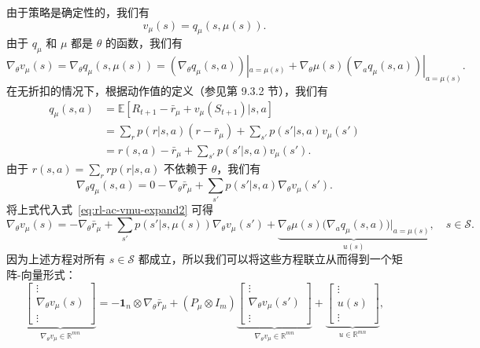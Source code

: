 \begin{derivation}\label{box:rl-ac-dpg-undisc-proof}
由于策略是确定性的，我们有
\[
v_{\mu}(s) = q_{\mu}(s, \mu(s)).
\]
由于 $q_{\mu}$ 和 $\mu$ 都是 $\theta$ 的函数，我们有
\begin{equation}
\nabla_{\theta} v_{\mu}(s) = \nabla_{\theta} q_{\mu}(s, \mu(s)) = (\nabla_{\theta} q_{\mu}(s, a)) |_{a = \mu(s)} + \nabla_{\theta} \mu(s) (\nabla_{a} q_{\mu}(s, a)) |_{a = \mu(s)}.
\label{eq:rl-ac-vmu-expand2}
\end{equation}
在无折扣的情况下，根据动作值的定义（参见第 9.3.2 节），我们有
\[
\begin{aligned}
q_{\mu}(s, a) &= \mathbb{E}[R_{t+1} - \bar{r}_{\mu} + v_{\mu}(S_{t+1}) | s, a] \\
&= \sum_{r} p(r | s, a)(r - \bar{r}_{\mu}) + \sum_{s'} p(s' | s, a) v_{\mu}(s') \\
&= r(s, a) - \bar{r}_{\mu} + \sum_{s'} p(s' | s, a) v_{\mu}(s').
\end{aligned}
\]
由于 $r(s, a) = \sum_{r} r p(r | s, a)$ 不依赖于 $\theta$，我们有
\[
\nabla_{\theta} q_{\mu}(s, a) = 0 - \nabla_{\theta} \bar{r}_{\mu} + \sum_{s'} p(s' | s, a) \nabla_{\theta} v_{\mu}(s').
\]
将上式代入式~\eqref{eq:rl-ac-vmu-expand2} 可得
\[
\nabla_{\theta} v_{\mu}(s) = - \nabla_{\theta} \bar{r}_{\mu} + \sum_{s'} p(s' | s, \mu(s)) \nabla_{\theta} v_{\mu}(s') + \underbrace{\nabla_{\theta} \mu(s) \big( \nabla_{a} q_{\mu}(s, a) \big) |_{a = \mu(s)}}_{u(s)}, \quad s \in \mathcal{S}.
\]
因为上述方程对所有 $s \in \mathcal{S}$ 都成立，所以我们可以将这些方程联立从而得到一个矩阵-向量形式：
\[
\underbrace{\left[ \begin{array}{c} \vdots \\ \nabla_{\theta} v_{\mu}(s) \\ \vdots \end{array} \right]}_{\nabla_{\theta} v_{\mu} \in \mathbb{R}^{mn}}
= - \mathbf{1}_{n} \otimes \nabla_{\theta} \bar{r}_{\mu} + (P_{\mu} \otimes I_{m}) \underbrace{\left[ \begin{array}{c} \vdots \\ \nabla_{\theta} v_{\mu}(s') \\ \vdots \end{array} \right]}_{\nabla_{\theta} v_{\mu} \in \mathbb{R}^{mn}}
+ \underbrace{\left[ \begin{array}{c} \vdots \\ u(s) \\ \vdots \end{array} \right]}_{u \in \mathbb{R}^{mn}},
\]
\end{derivation}

